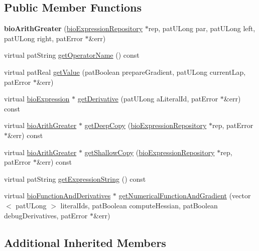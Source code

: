 \subsection*{Public Member Functions}
\begin{DoxyCompactItemize}
\item 
\mbox{\label{classbio_arith_greater_ac62ca926560eead11a14a047d65f0eab}} 
{\bfseries bio\+Arith\+Greater} (\hyperlink{classbio_expression_repository}{bio\+Expression\+Repository} $\ast$rep, pat\+U\+Long par, pat\+U\+Long left, pat\+U\+Long right, pat\+Error $\ast$\&err)
\item 
virtual pat\+String \hyperlink{classbio_arith_greater_a140169d1d84495e86d21dbd231c14f81}{get\+Operator\+Name} () const
\item 
virtual pat\+Real \hyperlink{classbio_arith_greater_ae486d20a8a8c6cfb1d287bb9de936ddb}{get\+Value} (pat\+Boolean prepare\+Gradient, pat\+U\+Long current\+Lap, pat\+Error $\ast$\&err)
\item 
virtual \hyperlink{classbio_expression}{bio\+Expression} $\ast$ \hyperlink{classbio_arith_greater_a20024dcb6e37aadcdfc7e92c58dc2af3}{get\+Derivative} (pat\+U\+Long a\+Literal\+Id, pat\+Error $\ast$\&err) const
\item 
virtual \hyperlink{classbio_arith_greater}{bio\+Arith\+Greater} $\ast$ \hyperlink{classbio_arith_greater_a39a03806f6465307c2086ce5ae2bed0a}{get\+Deep\+Copy} (\hyperlink{classbio_expression_repository}{bio\+Expression\+Repository} $\ast$rep, pat\+Error $\ast$\&err) const
\item 
virtual \hyperlink{classbio_arith_greater}{bio\+Arith\+Greater} $\ast$ \hyperlink{classbio_arith_greater_a73641032a8328db66db66469573ab61f}{get\+Shallow\+Copy} (\hyperlink{classbio_expression_repository}{bio\+Expression\+Repository} $\ast$rep, pat\+Error $\ast$\&err) const
\item 
virtual pat\+String \hyperlink{classbio_arith_greater_a391651a15d94bbb1cba7bbf74937d3bd}{get\+Expression\+String} () const
\item 
virtual \hyperlink{classbio_function_and_derivatives}{bio\+Function\+And\+Derivatives} $\ast$ \hyperlink{classbio_arith_greater_acd768ff3dd4a85e234cb5fa7b5e1cf91}{get\+Numerical\+Function\+And\+Gradient} (vector$<$ pat\+U\+Long $>$ literal\+Ids, pat\+Boolean compute\+Hessian, pat\+Boolean debug\+Derivatives, pat\+Error $\ast$\&err)
\end{DoxyCompactItemize}
\subsection*{Additional Inherited Members}


